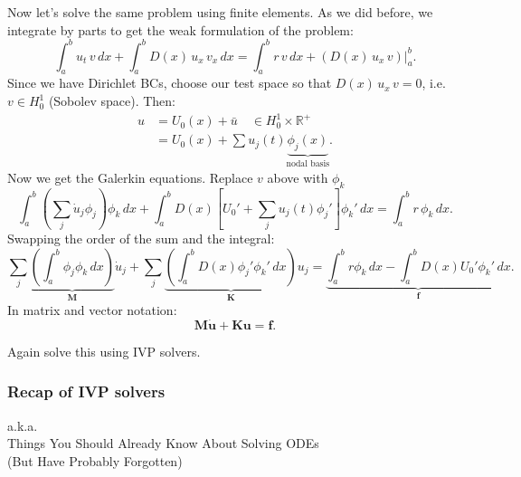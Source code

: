\documentclass[12pt, a4paper]{article}
\theoremstyle{definition}
\theoremstyle{remark}
\numberwithin{equation}{section}
\begin{document}
Now let's solve the same problem using finite elements. As we did before, we
integrate by parts to get the weak formulation of the problem:
$$ \int_{a}^{b} u_t \, v \, dx + \int_{a}^{b} D(x)\,  u_x \, v_x \, dx = 
\int_{a}^{b} r\, v\, dx + \left. (D(x)\,u_x\,v) \right|_{a}^{b}.  $$
Since we have Dirichlet BCs, choose our test space so that $D(x)\,u_x\,v=0$,
i.e. $v \in H_0^1$ (Sobolev space). Then:
\begin{align*}
u &= U_0(x) + \bar{u} \quad \in H_0^1 \times \mathbb{R}^+ \\
  &= U_0(x) + \sum u_j(t) \!\!\!\! \underbrace{\phi_j(x)}_{\text{nodal basis}}.
\end{align*}
Now we get the Galerkin equations. Replace $v$ above with $\phi_k$ 
$$ \int_a^b \left(\sum_j\dot{u}_j\phi_j\right)\phi_k\,dx +
   \int_a^b D(x)\left[ U_0' + \sum_j u_j(t)\phi_j'\right] \phi_k'\, dx
  = \int_a^b r \, \phi_k \, dx. $$
Swapping the order of the sum and the integral:
$$ \sum_j \underbrace{\left( \int_a^b \phi_j \phi_k \, dx \right)}_\mathbf{M} \dot{u}_j +
   \sum_j \underbrace{\left( \int_a^b D(x) \phi_j' \phi_k' \, dx \right)}_\mathbf{K} u_j =
   \underbrace{\int_a^b r\phi_k \, dx - %
               \int_a^b D(x) U_0' \phi_k' \, dx}_{\mathbf{f}}.
   $$
In matrix and vector notation:
$$ \mathbf{M\dot{u}} + \mathbf{Ku} = \mathbf{f}. $$

Again solve this using IVP solvers.

\newpage
\subsubsection{Recap of IVP solvers}

\begin{center}
a.k.a. \\
Things You Should Already Know About Solving ODEs \\
(But Have Probably Forgotten)
\end{center}
\end{document}
